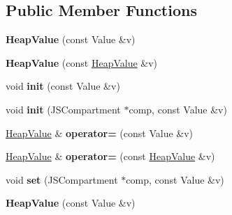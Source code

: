 \subsection*{Public Member Functions}
\begin{DoxyCompactItemize}
\item 
\hypertarget{classjs_1_1_heap_value_af6d31b04338fd8157a64c9b081f3e13e}{{\bfseries Heap\-Value} (const Value \&v)}\label{classjs_1_1_heap_value_af6d31b04338fd8157a64c9b081f3e13e}

\item 
\hypertarget{classjs_1_1_heap_value_a42b1676f29d8a1afebbfd6f91dabd3ae}{{\bfseries Heap\-Value} (const \hyperlink{classjs_1_1_heap_value}{Heap\-Value} \&v)}\label{classjs_1_1_heap_value_a42b1676f29d8a1afebbfd6f91dabd3ae}

\item 
\hypertarget{classjs_1_1_heap_value_a7116e3d46af038be6d816f669e8ba943}{void {\bfseries init} (const Value \&v)}\label{classjs_1_1_heap_value_a7116e3d46af038be6d816f669e8ba943}

\item 
\hypertarget{classjs_1_1_heap_value_abc774939caaf437376a504247df6263f}{void {\bfseries init} (J\-S\-Compartment $\ast$comp, const Value \&v)}\label{classjs_1_1_heap_value_abc774939caaf437376a504247df6263f}

\item 
\hypertarget{classjs_1_1_heap_value_ad22bbb3ae7cd16435aa2d94157b84b8c}{\hyperlink{classjs_1_1_heap_value}{Heap\-Value} \& {\bfseries operator=} (const Value \&v)}\label{classjs_1_1_heap_value_ad22bbb3ae7cd16435aa2d94157b84b8c}

\item 
\hypertarget{classjs_1_1_heap_value_a3e4b70c826d5f2719aa7bee28a2ac7a7}{\hyperlink{classjs_1_1_heap_value}{Heap\-Value} \& {\bfseries operator=} (const \hyperlink{classjs_1_1_heap_value}{Heap\-Value} \&v)}\label{classjs_1_1_heap_value_a3e4b70c826d5f2719aa7bee28a2ac7a7}

\item 
\hypertarget{classjs_1_1_heap_value_a573f94e4857d0039ad79cd56e5a5ddb7}{void {\bfseries set} (J\-S\-Compartment $\ast$comp, const Value \&v)}\label{classjs_1_1_heap_value_a573f94e4857d0039ad79cd56e5a5ddb7}

\item 
\hypertarget{classjs_1_1_heap_value_af6d31b04338fd8157a64c9b081f3e13e}{{\bfseries Heap\-Value} (const Value \&v)}\label{classjs_1_1_heap_value_af6d31b04338fd8157a64c9b081f3e13e}


\end{DoxyCompactItemize}

